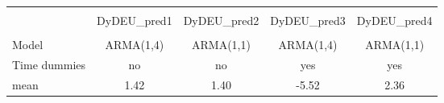 \begin{tabular}{lcccc}\toprule
            &\multicolumn{4}{c}{}                               \\
            & DyDEU\_pred1& DyDEU\_pred2& DyDEU\_pred3& DyDEU\_pred4\\
\midrule\\ Model&ARMA(1,4)&ARMA(1,1)&ARMA(1,4)&ARMA(1,1)\\ Time dummies&no&no&yes&yes\\ \midrule
mean        &        1.42&        1.40&       -5.52&        2.36\\
\bottomrule \end{tabular}
